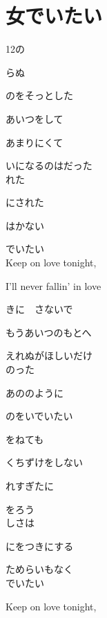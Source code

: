 \section{ 女でいたい}
\large{

12の

らぬ

のをそっとした

あいつをして

あまりにくて

いになるのはだった
\\

れた

にされた

はかない

でいたい
\\

Keep on love tonight,

I'll never fallin' in love

きに　さないで

もうあいつのもとへ

えれぬがほしいだけ
\\

のった

あののように

のをいでいたい

をねても

くちずけをしない

れすぎたに

をろう
\\

しさは

にをつきにする

ためらいもなく
\\

でいたい

Keep on love tonight,

}
